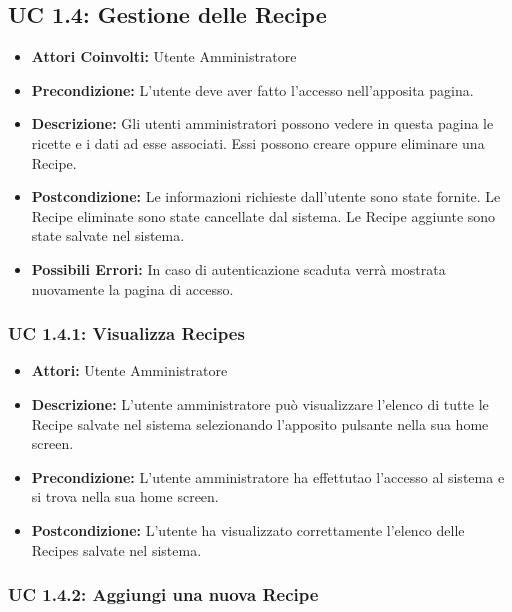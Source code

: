 \subsection{UC 1.4: Gestione delle Recipe}

\begin{itemize}
\item \textbf{Attori Coinvolti:} Utente Amministratore

\item \textbf{Precondizione:} L'utente deve aver fatto l'accesso nell'apposita pagina.

\item \textbf{Descrizione:} Gli utenti amministratori possono vedere in questa pagina le ricette e i dati ad esse associati. Essi possono creare oppure eliminare una Recipe.

\item \textbf{Postcondizione:} Le informazioni richieste dall'utente sono state fornite.
Le Recipe eliminate sono state cancellate dal sistema.
Le Recipe aggiunte sono state salvate nel sistema.

\item \textbf{Possibili Errori:} In caso di autenticazione scaduta verrà mostrata nuovamente la pagina di accesso.
\end{itemize}

\subsubsection{UC 1.4.1: Visualizza Recipes}

\begin{itemize}
\item \textbf{Attori:} Utente Amministratore
\item \textbf{Descrizione:} L'utente amministratore può visualizzare l'elenco di tutte le Recipe salvate nel sistema selezionando l'apposito pulsante nella sua home screen.
\item \textbf{Precondizione:} L'utente amministratore ha effettutao l'accesso al sistema e si trova nella sua home screen.
\item \textbf{Postcondizione:} L'utente ha visualizzato correttamente l'elenco delle Recipes salvate nel sistema.
\end{itemize}

\subsubsection{UC 1.4.2: Aggiungi una nuova Recipe}

